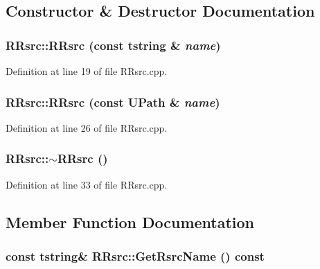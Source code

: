 \subsection{Constructor \& Destructor Documentation}
\hypertarget{class_r_rsrc_3fa33990b894aa8145499a2c9b801282}{
\subsubsection[{RRsrc}]{\setlength{\rightskip}{0pt plus 5cm}RRsrc::RRsrc (const {\bf tstring} \& {\em name})}}
\label{class_r_rsrc_3fa33990b894aa8145499a2c9b801282}




Definition at line 19 of file RRsrc.cpp.\hypertarget{class_r_rsrc_fd183bc1b0b19f06d8036c2621fb4a33}{
\subsubsection[{RRsrc}]{\setlength{\rightskip}{0pt plus 5cm}RRsrc::RRsrc (const {\bf UPath} \& {\em name})}}
\label{class_r_rsrc_fd183bc1b0b19f06d8036c2621fb4a33}




Definition at line 26 of file RRsrc.cpp.\hypertarget{class_r_rsrc_537cb51287dd0d08bea8632f07313c38}{
\subsubsection[{$\sim$RRsrc}]{\setlength{\rightskip}{0pt plus 5cm}RRsrc::$\sim$RRsrc ()}}
\label{class_r_rsrc_537cb51287dd0d08bea8632f07313c38}




Definition at line 33 of file RRsrc.cpp.

\subsection{Member Function Documentation}
\hypertarget{class_r_rsrc_b380ec859468787943682d0f1113f2d8}{
\subsubsection[{GetRsrcName}]{\setlength{\rightskip}{0pt plus 5cm}const {\bf tstring}\& RRsrc::GetRsrcName () const}}
\label{class_r_rsrc_b380ec859468787943682d0f1113f2d8}




